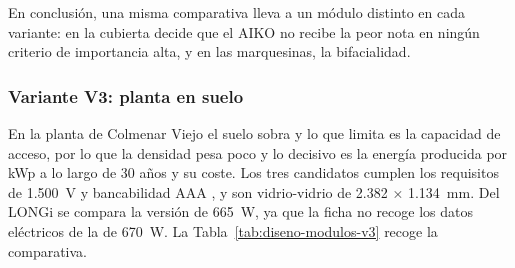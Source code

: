 En conclusión, una misma comparativa lleva a un módulo distinto en cada variante: en la cubierta decide que el AIKO no recibe la peor nota en ningún criterio de importancia alta, y en las marquesinas, la bifacialidad.

\subsubsection{Variante V3: planta en suelo}
\label{subsubsec:diseno-modulo-v3}

En la planta de Colmenar Viejo el suelo sobra y lo que limita es la capacidad de acceso, por lo que la densidad pesa poco y lo decisivo es la energía producida por kWp a lo largo de 30 años y su coste. Los tres candidatos cumplen los requisitos de 1.500~V y bancabilidad AAA \cite{PVTechBancabilidad}, y son vidrio-vidrio de 2.382 × 1.134~mm. Del LONGi se compara la versión de 665~W, ya que la ficha no recoge los datos eléctricos de la de 670~W. La Tabla~\ref{tab:diseno-modulos-v3} recoge la comparativa.

